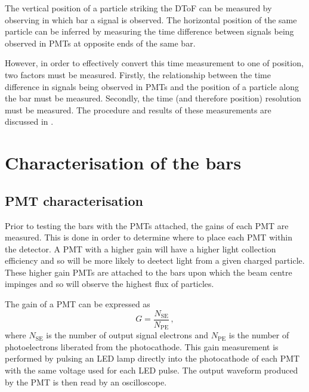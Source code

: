The vertical position of a particle striking the DToF can be measured by observing in which bar a signal is observed.
The horizontal position of the same particle can be inferred by measuring the time difference between signals being observed in PMTs at opposite ends of the same bar.

However, in order to effectively convert this time measurement to one of position, two factors must be measured.
Firstly, the relationship between the time difference in signals being observed in PMTs and the position of a particle along the bar must be measured.
Secondly, the time (and therefore position) resolution must be measured.
The procedure and results of these measurements are discussed in .

\section{Characterisation of the bars}
\label{sec:hptpc_dtof_characterisation:characterisation}

\subsection{PMT characterisation}
\label{sec:hptpc_dtof_characterisation:characterisation:pmt}

Prior to testing the bars with the PMTs attached, the gains of each PMT are measured.
This is done in order to determine where to place each PMT within the detector.
A PMT with a higher gain will have a higher light collection efficiency and so will be more likely to deetect light from a given charged particle.
These higher gain PMTs are attached to the bars upon which the beam centre impinges and so will observe the highest flux of particles.

The gain of a PMT can be expressed as
\begin{equation}
  G = \frac{N_{\text{SE}}}{N_{\text{PE}}} \, ,
\end{equation}
where $N_{\text{SE}}$ is the number of output signal electrons and $N_{\text{PE}}$ is the number of photoelectrons liberated from the photocathode.
This gain measurement is performed by pulsing an LED lamp directly into the photocathode of each PMT with the same voltage used for each LED pulse.
The output waveform produced by the PMT is then read by an oscilloscope.

